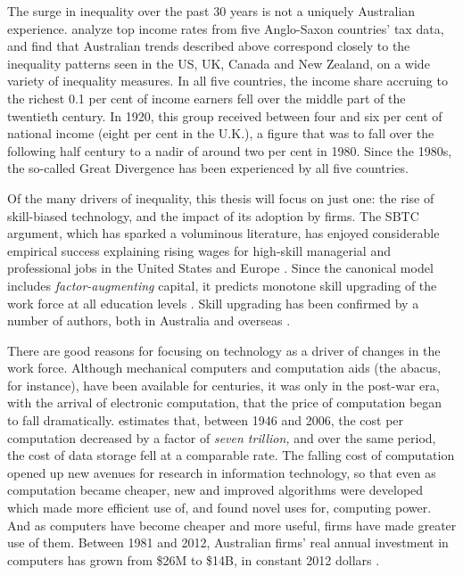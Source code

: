 The surge in inequality over the past 30 years is not a uniquely Australian experience. \citet{Atkinson2013} analyze top income rates from five Anglo-Saxon countries' tax data, and find that Australian trends described above correspond closely to the inequality patterns seen in the US, UK, Canada and New Zealand, on a wide variety of inequality measures. In all five countries, the income share accruing to the richest 0.1 per cent of income earners fell over the middle part of the twentieth century. In 1920, this group received between four and six per cent of national income (eight per cent in the U.K.), a figure that was to fall over the following half century to a nadir of around two per cent in 1980. Since the 1980s, the so-called Great Divergence has been experienced by all five countries. 

Of the many drivers of inequality, this thesis will focus on just one: the rise of skill-biased technology, and the impact of its adoption by firms. The SBTC argument, which has sparked a voluminous literature, has enjoyed considerable empirical success explaining rising wages for high-skill managerial and professional jobs in the United States and Europe \citep{Katz1992}. Since the canonical model includes \emph{factor-augmenting} capital, it predicts monotone skill upgrading of the work force at all education levels \citep{Levy2003}. Skill upgrading has been confirmed by a number of authors, both in Australia \citep{Esposto2012, Wooden2000, Cully1999} and overseas \citep{Autor2008}. 

There are good reasons for focusing on technology as a driver of changes in the work force. Although mechanical computers and computation aids (the abacus, for instance), have been available for centuries, it was only in the post-war era, with the arrival of electronic computation, that the price of computation began to fall dramatically. \citet{Nordhaus2007} estimates that, between 1946 and 2006, the cost per computation decreased by a factor of {\em seven trillion,} and over the same period, the cost of data storage fell at a comparable rate. The falling cost of computation opened up new avenues for research in information technology, so that even as computation became cheaper, new and improved algorithms were developed which made more efficient use of, and found novel uses for, computing power. And as computers have become cheaper and more useful, firms have made greater use of them. Between 1981 and 2012, Australian firms' real annual investment in computers has grown from \$26M to \$14B, in constant 2012 dollars \citet{ABS5206}.

